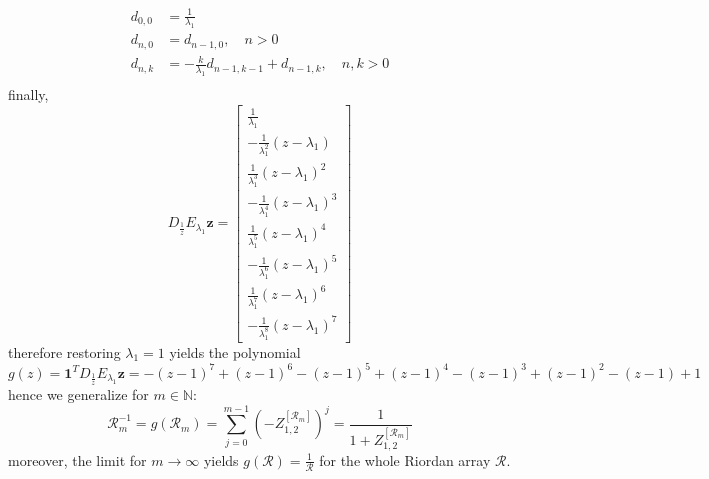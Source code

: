 \begin{displaymath}
\begin{split}
d_{0,0}&=\frac{1}{\lambda_{1}}\\
d_{n,0}&=d_{n-1, 0}, \quad n>0 \\
d_{n,k}&=-\frac{k}{\lambda_{1}}d_{n-1, k-1} + d_{n-1,k}, \quad n,k > 0\\
\end{split}
\end{displaymath}
finally,
\begin{displaymath}
D_{\frac{1}{z}}E_{\lambda_{1}}\boldsymbol{z} = \left[\begin{matrix}\frac{1}{\lambda_{1}}\\- \frac{1}{\lambda_{1}^{2}} \left(z - \lambda_{1}\right)\\\frac{1}{\lambda_{1}^{3}} \left(z - \lambda_{1}\right)^{2}\\- \frac{1}{\lambda_{1}^{4}} \left(z - \lambda_{1}\right)^{3}\\\frac{1}{\lambda_{1}^{5}} \left(z - \lambda_{1}\right)^{4}\\- \frac{1}{\lambda_{1}^{6}} \left(z - \lambda_{1}\right)^{5}\\\frac{1}{\lambda_{1}^{7}} \left(z - \lambda_{1}\right)^{6}\\- \frac{1}{\lambda_{1}^{8}} \left(z - \lambda_{1}\right)^{7}\end{matrix}\right]
\end{displaymath}
therefore restoring $\lambda_{1}=1$ yields the polynomial
\[g{\left (z \right )} = \boldsymbol{1}^{T}D_{\frac{1}{z}}E_{\lambda_{1}}\boldsymbol{z} = - \left(z - 1\right)^{7} + \left(z - 1\right)^{6} - \left(z - 1\right)^{5} + \left(z - 1\right)^{4} - \left(z - 1\right)^{3} + \left(z - 1\right)^{2} - (z-1) + 1\]
hence we generalize for $m\in\mathbb{N}$:
\begin{displaymath}
\mathcal{R}_{m}^{-1} = g{\left (\mathcal{R}_{m} \right )} = \sum_{j=0}^{m-1}{\left(-Z_{1,2}^{[\mathcal{R}_{m}]}\right)^{j}} = \frac{1}{1+Z_{1,2}^{[\mathcal{R}_{m}]}}
\end{displaymath}
moreover, the limit for $m \rightarrow \infty$ yields $ g{\left (\mathcal{R} \right )} = \frac{1}{\mathcal{R}} $ for the whole Riordan array $\mathcal{R}$.
\fi

